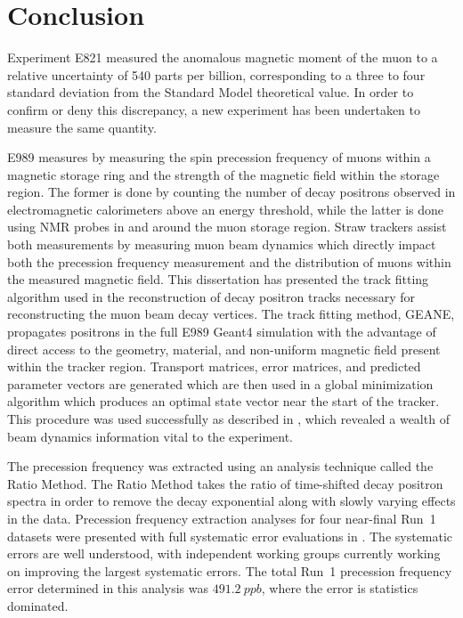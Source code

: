 
\thispagestyle{myheadings} %

\chapter{Conclusion}
\label{chapter:Conclusion}


Experiment E821 measured the anomalous magnetic moment of the muon to a relative uncertainty of 540 parts per billion, corresponding to a three to four standard deviation from the Standard Model theoretical value. In order to confirm or deny this discrepancy, a new experiment has been undertaken to measure the same quantity.


E989 measures \amu by measuring the spin precession frequency of muons within a magnetic storage ring and the strength of the magnetic field within the storage region. The former is done by counting the number of decay positrons observed in electromagnetic calorimeters above an energy threshold, while the latter is done using NMR probes in and around the muon storage region. Straw trackers assist both measurements by measuring muon beam dynamics which directly impact both the precession frequency measurement and the distribution of muons within the measured magnetic field. This dissertation has presented the track fitting algorithm used in the reconstruction of decay positron tracks necessary for reconstructing the muon beam decay vertices. The track fitting method, GEANE, propagates positrons in the full E989 Geant4 simulation with the advantage of direct access to the geometry, material, and non-uniform magnetic field present within the tracker region. Transport matrices, error matrices, and predicted parameter vectors are generated which are then used in a global \chisq minimization algorithm which produces an optimal state vector near the start of the tracker. This procedure was used successfully as described in , which revealed a wealth of beam dynamics information vital to the experiment.


The precession frequency was extracted using an analysis technique called the Ratio Method. The Ratio Method takes the ratio of time-shifted decay positron spectra in order to remove the decay exponential along with slowly varying effects in the data. Precession frequency extraction analyses for four near-final Run~1 datasets were presented with full systematic error evaluations in . The systematic errors are well understood, with independent working groups currently working on improving the largest systematic errors. The total Run~1 precession frequency error determined in this analysis was $\SI{491.2}{ppb}$, where the error is statistics dominated. 



